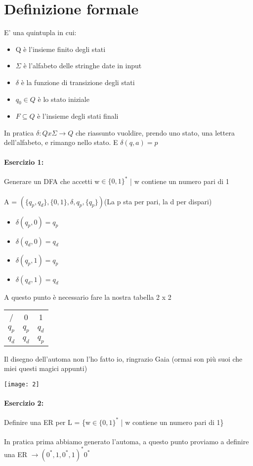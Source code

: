 \documentclass[12pt, a4paper, openany, oneside]{book}
\begin{document}
\section{Definizione formale}
E' una quintupla in cui:
\begin{itemize}
	\item Q è l'insieme finito degli stati
	\item $\Sigma$ è l'alfabeto delle stringhe date in input
	\item $\delta$ è la funzione di transizione degli stati
	\item $q_{0}\in Q$ è lo stato iniziale
	\item $F \subseteq Q$ è l'insieme degli stati finali
\end{itemize}
In pratica $\delta:Qx\Sigma \to Q$ che riassunto vuoldire, prendo uno stato, 
una lettera dell'alfabeto, e rimango nello stato. E $\delta(q,a) = p$
\paragraph{Esercizio 1: } Generare un DFA che accetti w$\in \{0,1\}^{*}$ | w
contiene un numero pari di 1 \\ \\
A = $(\{q_{p}, q_{d}\}, \{0,1\}, \delta, q_{p}, \{q_{p}\}) $(La p sta per pari,
la d per dispari)
\begin{itemize}
	\item $\delta(q_{p}, 0) = q_{p}$
	\item $\delta(q_{d}, 0) = q_{d}$
	\item $\delta(q_{p}, 1) = q_{p}$
	\item $\delta(q_{d}, 1) = q_{d}$
\end{itemize}
A questo punto è necessario fare la nostra tabella 2 x 2 
\begin{center}
\begin{tabular}{ | c | c | c }
 / &  0 & 1 \\ 
 $q_{p}$ & $q_{p}$  &  $q_{d}$ \\  
 $q_{d}$ &  $q_{d}$ & $q_{p}$     
\end{tabular}
\end{center}
Il disegno dell'automa non l'ho fatto io, ringrazio Gaia (ormai son più suoi
che miei questi magici appunti)
\begin{center}
\texttt{[image: 2]}
\end{center}
\paragraph{Esercizio 2: } Definire una ER per L = \{w$\in \{0,1\}^{*}$ | w
contiene un numero pari di 1\} \\ \\
In pratica prima abbiamo generato l'automa, a questo punto proviamo a definire
una ER $\to (0^{*},1,0^{*},1)^{*}0^{*}$
\end{document}
